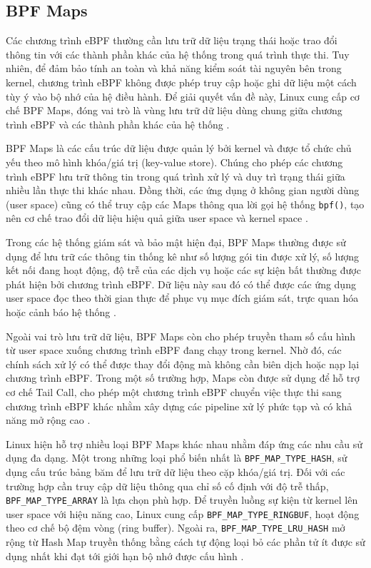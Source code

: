 \documentclass[../DoAn.tex]{subfiles}
\begin{document}
\subsection{BPF Maps}

Các chương trình eBPF thường cần lưu trữ dữ liệu trạng thái hoặc trao đổi thông tin với các thành phần khác của hệ thống trong quá trình thực thi. Tuy nhiên, để đảm bảo tính an toàn và khả năng kiểm soát tài nguyên bên trong kernel, chương trình eBPF không được phép truy cập hoặc ghi dữ liệu một cách tùy ý vào bộ nhớ của hệ điều hành. Để giải quyết vấn đề này, Linux cung cấp cơ chế BPF Maps, đóng vai trò là vùng lưu trữ dữ liệu dùng chung giữa chương trình eBPF và các thành phần khác của hệ thống \cite{linux_bpf_docs}.

BPF Maps là các cấu trúc dữ liệu được quản lý bởi kernel và được tổ chức chủ yếu theo mô hình khóa/giá trị (key-value store). Chúng cho phép các chương trình eBPF lưu trữ thông tin trong quá trình xử lý và duy trì trạng thái giữa nhiều lần thực thi khác nhau. Đồng thời, các ứng dụng ở không gian người dùng (user space) cũng có thể truy cập các Maps thông qua lời gọi hệ thống \texttt{bpf()}, tạo nên cơ chế trao đổi dữ liệu hiệu quả giữa user space và kernel space \cite{linux_bpf_docs}.

Trong các hệ thống giám sát và bảo mật hiện đại, BPF Maps thường được sử dụng để lưu trữ các thông tin thống kê như số lượng gói tin được xử lý, số lượng kết nối đang hoạt động, độ trễ của các dịch vụ hoặc các sự kiện bất thường được phát hiện bởi chương trình eBPF. Dữ liệu này sau đó có thể được các ứng dụng user space đọc theo thời gian thực để phục vụ mục đích giám sát, trực quan hóa hoặc cảnh báo hệ thống \cite{linux_bpf_docs}.

Ngoài vai trò lưu trữ dữ liệu, BPF Maps còn cho phép truyền tham số cấu hình từ user space xuống chương trình eBPF đang chạy trong kernel. Nhờ đó, các chính sách xử lý có thể được thay đổi động mà không cần biên dịch hoặc nạp lại chương trình eBPF. Trong một số trường hợp, Maps còn được sử dụng để hỗ trợ cơ chế Tail Call, cho phép một chương trình eBPF chuyển việc thực thi sang chương trình eBPF khác nhằm xây dựng các pipeline xử lý phức tạp và có khả năng mở rộng cao \cite{linux_bpf_docs}.

Linux hiện hỗ trợ nhiều loại BPF Maps khác nhau nhằm đáp ứng các nhu cầu sử dụng đa dạng. Một trong những loại phổ biến nhất là \texttt{BPF\_MAP\_TYPE\_HASH}, sử dụng cấu trúc bảng băm để lưu trữ dữ liệu theo cặp khóa/giá trị. Đối với các trường hợp cần truy cập dữ liệu thông qua chỉ số cố định với độ trễ thấp, \texttt{BPF\_MAP\_TYPE\_ARRAY} là lựa chọn phù hợp. Để truyền luồng sự kiện từ kernel lên user space với hiệu năng cao, Linux cung cấp \texttt{BPF\_MAP\_TYPE\_RINGBUF}, hoạt động theo cơ chế bộ đệm vòng (ring buffer). Ngoài ra, \texttt{BPF\_MAP\_TYPE\_LRU\_HASH} mở rộng từ Hash Map truyền thống bằng cách tự động loại bỏ các phần tử ít được sử dụng nhất khi đạt tới giới hạn bộ nhớ được cấu hình \cite{linux_bpf_docs}.
\end{document}
